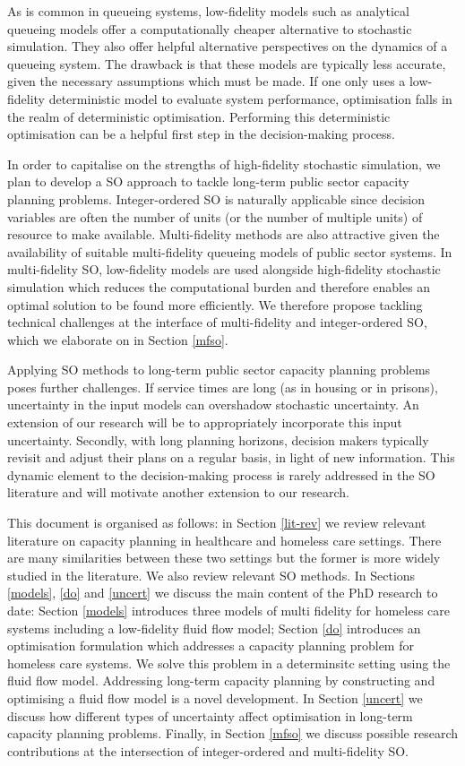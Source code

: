 \documentclass[12pt,a4paper]{article}
\begin{document}
As is common in queueing systems, low-fidelity models such as analytical queueing models offer a computationally cheaper alternative to stochastic simulation. They also offer helpful alternative perspectives on the dynamics of a queueing system. The drawback is that these models are typically less accurate, given the necessary assumptions which must be made. If one only uses a low-fidelity deterministic model to evaluate system performance, optimisation falls in the realm of deterministic optimisation. Performing this deterministic optimisation can be a helpful first step in the decision-making process. 

In order to capitalise on the strengths of high-fidelity stochastic simulation, we plan to develop a SO approach to tackle long-term public sector capacity planning problems. Integer-ordered SO is naturally applicable since decision variables are often the number of units (or the number of multiple units) of resource to make available. Multi-fidelity methods are also attractive given the availability of suitable multi-fidelity queueing models of public sector systems. In multi-fidelity SO, low-fidelity models are used alongside high-fidelity stochastic simulation which reduces the computational burden and therefore enables an optimal solution to be found more efficiently. We therefore propose tackling technical challenges at the interface of multi-fidelity and integer-ordered SO, which we elaborate on in Section \ref{mfso}.

Applying SO methods to long-term public sector capacity planning problems poses further challenges. If service times are long (as in housing or in prisons), uncertainty in the input models can overshadow stochastic uncertainty. An extension of our research will be to appropriately incorporate this input uncertainty. Secondly, with long planning horizons, decision makers typically revisit and adjust their plans on a regular basis, in light of new information. This dynamic element to the decision-making process is rarely addressed in the SO literature and will motivate another extension to our research. 

This document is organised as follows: in Section \ref{lit-rev} we review relevant literature on capacity planning in healthcare and  homeless care settings. There are many similarities between these two settings but the former is more widely studied in the literature. We also review relevant SO methods. In Sections \ref{models}, \ref{do} and \ref{uncert} we discuss the main content of the PhD research to date: Section \ref{models} introduces three models of multi fidelity for homeless care systems including a low-fidelity fluid flow model; Section \ref{do} introduces an optimisation formulation which addresses a capacity planning problem for homeless care systems. We solve this problem in a determinsitc setting using the fluid flow model. Addressing long-term capacity planning by constructing and optimising a fluid flow model \citep{burgess2024time} is a novel development. In Section \ref{uncert} we discuss how different types of uncertainty affect optimisation in long-term capacity planning problems. Finally, in Section \ref{mfso} we discuss possible research contributions at the intersection of integer-ordered and multi-fidelity SO. 
\end{document}
